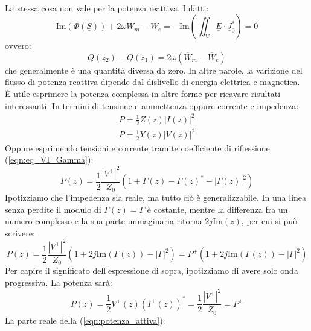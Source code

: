 \documentclass{book}
\begin{document}
        \\ La stessa cosa non vale per la potenza reattiva. Infatti:
        \begin{equation}
            \textrm{Im}(\Phi(\underline{S})) +2 \omega \overline{W}_{m}-\overline{W}_{e} = - \textrm{Im}(\iint_{V} \underline{E} \cdot \underline{J}_{0} ^{*}) = 0
        \end{equation}
        ovvero:
        \begin{equation}
            Q(z_{2})-Q(z_{1})=2 \omega (\overline{W}_{m}-\overline{W}_{e})
        \end{equation}
        che generalmente è una quantità diversa da zero. In altre parole, la varizione del flusso di potenza reattiva
        dipende dal dislivello di energia elettrica e magnetica.
        \\ 
        È utile esprimere la potenza complessa in altre forme per ricavare risultati interessanti. In termini 
        di tensione e ammettenza oppure corrente e impedenza:
        \begin{align}
            P = \frac{1}{2}Z(z)|I(z)|^{2} \\
            P= \frac{1}{2}Y(z)|V(z)|^{2}
        \end{align}
        Oppure esprimendo tensioni e corrente tramite coefficiente di riflessione (\ref{eqn:eq_VI_Gamma}):
        \begin{equation}
            P(z)=\frac{1}{2}\frac{|V^{+}|^{2}}{Z_{0}} (1+\Gamma(z)-\Gamma(z)^{*}-|\Gamma(z)|^{2})
        \end{equation}
        Ipotizziamo che l'impedenza sia reale, ma tutto ciò è generalizzabile. In una linea senza perdite il modulo di $\Gamma(z) = \Gamma$ è costante, mentre la differenza fra un numero complesso e 
        la sua parte immaginaria ritorna $2j\textrm{Im}(z)$, per cui si può scrivere:
        \begin{equation}
            \label{eqn:potenza_attiva}
            P(z)=\frac{1}{2}\frac{|V^{+}|^{2}}{Z_{0}}(1+2j\textrm{Im}(\Gamma(z))-|\Gamma|^{2}) =
            P^{+}(1+2j\textrm{Im}(\Gamma (z))-|\Gamma|^{2})
        \end{equation}
        Per capire il significato dell'espressione di sopra, ipotizziamo di avere solo onda progressiva. La potenza
        sarà:
        \begin{equation}
            P(z)= \frac{1}{2}V^{+}(z)(I^{+}(z))^{*} = \frac{1}{2}\frac{|V^{+}|^{2}}{Z_{0}}=P^{+}
        \end{equation}
        La parte reale della (\ref{eqn:potenza_attiva}):
\end{document}
